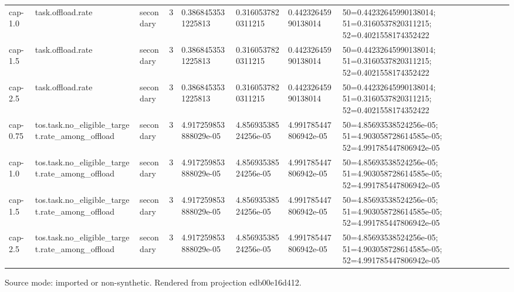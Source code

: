 {\begin{table}[htbp]
\begin{tabular}{llllllll}
cap-1.0 & task.offload.rate & secondary & 3 & 0.3868453531225813 & 0.3160537820311215 & 0.44232645990138014 & 50=0.44232645990138014; 51=0.3160537820311215; 52=0.4021558174352422 \\
cap-1.5 & task.offload.rate & secondary & 3 & 0.3868453531225813 & 0.3160537820311215 & 0.44232645990138014 & 50=0.44232645990138014; 51=0.3160537820311215; 52=0.4021558174352422 \\
cap-2.5 & task.offload.rate & secondary & 3 & 0.3868453531225813 & 0.3160537820311215 & 0.44232645990138014 & 50=0.44232645990138014; 51=0.3160537820311215; 52=0.4021558174352422 \\
cap-0.75 & tos.task.no\_eligible\_target.rate\_among\_offload & secondary & 3 & 4.917259853888029e-05 & 4.85693538524256e-05 & 4.991785447806942e-05 & 50=4.85693538524256e-05; 51=4.903058728614585e-05; 52=4.991785447806942e-05 \\
cap-1.0 & tos.task.no\_eligible\_target.rate\_among\_offload & secondary & 3 & 4.917259853888029e-05 & 4.85693538524256e-05 & 4.991785447806942e-05 & 50=4.85693538524256e-05; 51=4.903058728614585e-05; 52=4.991785447806942e-05 \\
cap-1.5 & tos.task.no\_eligible\_target.rate\_among\_offload & secondary & 3 & 4.917259853888029e-05 & 4.85693538524256e-05 & 4.991785447806942e-05 & 50=4.85693538524256e-05; 51=4.903058728614585e-05; 52=4.991785447806942e-05 \\
cap-2.5 & tos.task.no\_eligible\_target.rate\_among\_offload & secondary & 3 & 4.917259853888029e-05 & 4.85693538524256e-05 & 4.991785447806942e-05 & 50=4.85693538524256e-05; 51=4.903058728614585e-05; 52=4.991785447806942e-05 \\
\hline
\end{tabular}
\par\footnotesize
Source mode: imported or non-synthetic.
Rendered from projection edb00e16d412.
\end{table}
}
